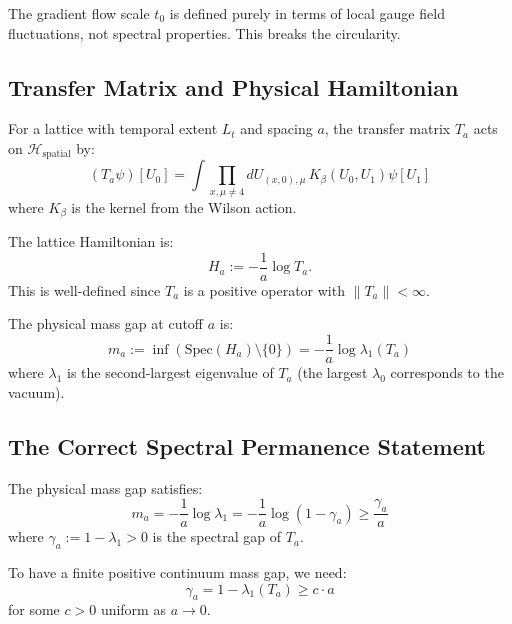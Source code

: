 \begin{remark}
The gradient flow scale $t_0$ is defined purely in terms of local gauge field fluctuations, not spectral properties. This breaks the circularity.
\end{remark}

\subsection{Transfer Matrix and Physical Hamiltonian}

\begin{definition}
For a lattice with temporal extent $L_t$ and spacing $a$, the transfer matrix $T_a$ acts on $\mathcal{H}_{\text{spatial}}$ by:
\begin{equation}
    (T_a \psi)[U_0] = \int \prod_{x, \mu \neq 4} dU_{(x,0),\mu} \, K_\beta(U_0, U_1) \psi[U_1]
\end{equation}
where $K_\beta$ is the kernel from the Wilson action.
\end{definition}

\begin{definition}
The lattice Hamiltonian is:
\begin{equation}
    H_a := -\frac{1}{a} \log T_a.
\end{equation}
This is well-defined since $T_a$ is a positive operator with $\|T_a\| < \infty$.
\end{definition}

\begin{definition}
The physical mass gap at cutoff $a$ is:
\begin{equation}
    m_a := \inf\left( \mathrm{Spec}(H_a) \setminus \{0\} \right) = -\frac{1}{a} \log \lambda_1(T_a)
\end{equation}
where $\lambda_1$ is the second-largest eigenvalue of $T_a$ (the largest $\lambda_0$ corresponds to the vacuum).
\end{definition}

\subsection{The Correct Spectral Permanence Statement}

\begin{theorem}\label{thm:physical-gap-scaling}
The physical mass gap satisfies:
\begin{equation}
    m_a = -\frac{1}{a} \log \lambda_1 = -\frac{1}{a} \log(1 - \gamma_a) \geq \frac{\gamma_a}{a}
\end{equation}
where $\gamma_a := 1 - \lambda_1 > 0$ is the spectral gap of $T_a$.

To have a finite positive continuum mass gap, we need:
\begin{equation}
    \gamma_a = 1 - \lambda_1(T_a) \geq c \cdot a
\end{equation}
for some $c > 0$ uniform as $a \to 0$.
\end{theorem}

